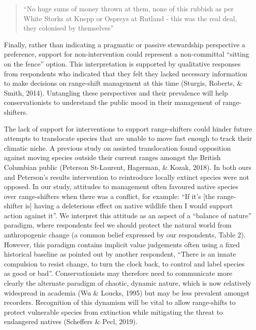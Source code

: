 \documentclass[
]{article}
\begin{document}
\begin{quote}
``No huge sums of money thrown at them, none of this rubbish as per
White Storks at Knepp or Ospreys at Rutland - this was the real deal,
they colonised by themselves''
\end{quote}

Finally, rather than indicating a pragmatic or passive stewardship
perspective a preference, support for non-intervention could represent a
non-committal ``sitting on the fence'' option. This interpretation is
supported by qualitative responses from respondents who indicated that
they felt they lacked necessary information to make decisions on
range-shift management at this time (Sturgis, Roberts, \& Smith, 2014).
Untangling these perspectives and their prevalence will help
conservationists to understand the public mood in their management of
range-shifters.

The lack of support for interventions to support range-shifters could
hinder future attempts to translocate species that are unable to move
fast enough to track their climatic niche. A previous study on assisted
translocation found opposition against moving species outside their
current ranges amongst the British Columbian public (Peterson
St-Laurent, Hagerman, \& Kozak, 2018). In both ours and Peterson's
results intervention to reintroduce locally extinct species were not
opposed. In our study, attitudes to management often favoured native
species over range-shifters when there was a conflict, for example: ``If
it's {[}the range-shifter is{]} having a deleterious effect on native
wildlife then I would support action against it''. We interpret this
attitude as an aspect of a ``balance of nature'' paradigm, where
respondents feel we should protect the natural world from anthropogenic
change (a common belief expressed by our respondents, Table 2). However,
this paradigm contains implicit value judgements often using a fixed
historical baseline as pointed out by another respondent, ``There is an
innate compulsion to resist change, to turn the clock back, to control
and label species as good or bad''. Conservationists may therefore need
to communicate more clearly the alternate paradigm of chaotic, dynamic
nature, which is now relatively widespread in academia (Wu \& Loucks,
1995) but may be less prevalent amongst recorders. Recognition of this
dynamism will be vital to allow range-shifts to protect vulnerable
species from extinction while mitigating the threat to endangered
natives (Scheffers \& Pecl, 2019).
\end{document}

